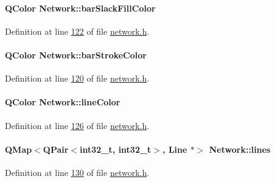 \paragraph[{bar\+Slack\+Fill\+Color}]{\setlength{\rightskip}{0pt plus 5cm}Q\+Color Network\+::bar\+Slack\+Fill\+Color}\label{class_network_ad78d9a206daf4ba0780067b5043c7f5c}


Definition at line \hyperlink{network_8h_source_l00122}{122} of file \hyperlink{network_8h_source}{network.\+h}.

\hypertarget{class_network_ad69052271ab0a9899948815b6201f2c6}{}
\paragraph[{bar\+Stroke\+Color}]{\setlength{\rightskip}{0pt plus 5cm}Q\+Color Network\+::bar\+Stroke\+Color}\label{class_network_ad69052271ab0a9899948815b6201f2c6}


Definition at line \hyperlink{network_8h_source_l00120}{120} of file \hyperlink{network_8h_source}{network.\+h}.

\hypertarget{class_network_a453db7f1a994603fe4d38ac5899eb09c}{}
\paragraph[{line\+Color}]{\setlength{\rightskip}{0pt plus 5cm}Q\+Color Network\+::line\+Color}\label{class_network_a453db7f1a994603fe4d38ac5899eb09c}


Definition at line \hyperlink{network_8h_source_l00126}{126} of file \hyperlink{network_8h_source}{network.\+h}.

\hypertarget{class_network_acda0fd42e712e460a08a0e96511ee7eb}{}
\paragraph[{lines}]{\setlength{\rightskip}{0pt plus 5cm}Q\+Map$<$Q\+Pair$<$int32\+\_\+t, int32\+\_\+t$>$, {\bf Line} $\ast$$>$ Network\+::lines}\label{class_network_acda0fd42e712e460a08a0e96511ee7eb}


Definition at line \hyperlink{network_8h_source_l00130}{130} of file \hyperlink{network_8h_source}{network.\+h}.

